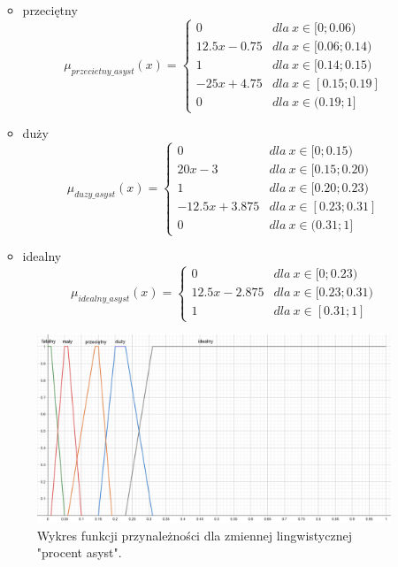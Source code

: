 \documentclass{classrep}
\begin{document}
\begin{enumerate}
\begin{itemize}
\begin{equation}
        \end{equation}
        \item przeciętny
        \begin{equation}
            \mu_{przecietny\_asyst}(x) = \left\{\begin{matrix} 0 & dla \: x\in [0;0.06) \\ 12.5x - 0.75 & dla \: x\in[0.06;0.14) \\ 1 & dla \: x\in [0.14; 0.15) \\ -25x + 4.75 & dla \: x\in[0.15;0.19]\\ 0 & dla \: x\in (0.19;1] \end{matrix}\right.
        \end{equation}
        \item duży
        \begin{equation}
            \mu_{duzy\_asyst}(x) = \left\{\begin{matrix} 0 & dla \: x\in [0;0.15) \\ 20x - 3 & dla \: x\in[0.15;0.20) \\ 1 & dla \: x\in [0.20; 0.23) \\ -12.5x + 3.875 & dla \: x\in[0.23;0.31] \\ 0 & dla \: x\in (0.31;1]\end{matrix}\right.
        \end{equation}
        \item idealny
        \begin{equation}
            \mu_{idealny\_asyst}(x) = \left\{\begin{matrix} 0 & dla \: x\in [0;0.23) \\ 12.5x - 2.875 & dla \: x\in[0.23;0.31) \\ 1 & dla \: x\in [0.31; 1] \end{matrix}\right.
        \end{equation}
    \end{itemize}
     \begin{figure}[H]
    \centering
    \includegraphics[width=14cm]{wykres_pr_asyst.png}
    \caption{Wykres funkcji przynależności dla zmiennej lingwistycznej "procent asyst".}
    \label{rysunek:procent_asyst}
\end{figure}
\end{enumerate}
\end{document}
